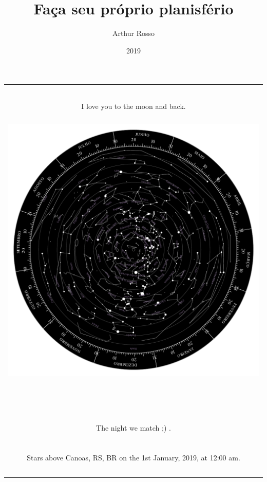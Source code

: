 \documentclass{article}
\title{Faça seu próprio planisfério}
\author{Arthur Rosso}
\date{2019}
\begin{document}
\thispagestyle{empty}

\setlength{\arrayrulewidth}{3mm}
\begin{center}
{
\begin{tabular}{ |c|c|c|  }
\hline
\\ 
\\ 
\\ 
\multicolumn{3}{|c|}{
    \begin{LARGE}
    \centerline{I love you to the moon and back.}
    \end{LARGE}
} 
\\ 
\\ 
\multicolumn{3}{|c|}{
    \centerline{\includegraphics{tmp/starwheel}}
} 
\\
\\
\\
\\
\\
\\
\\
\\
\\
\\
\\
\\
\\ \hspace{18.778cm}
\\
\multicolumn{3}{|c|}{
    \begin{LARGE}
    \centerline{The night we match ;) .}
    \end{LARGE}
}
\\
\\
\multicolumn{3}{|c|}{
    \begin{large}
    \centerline{Stars above Canoas, RS, BR on the 1st January, 2019, at 12:00 am.}
    \end{large}
} 
\\
\\
\\
\hline
\end{tabular}
}
\end{center}
\end{document}
